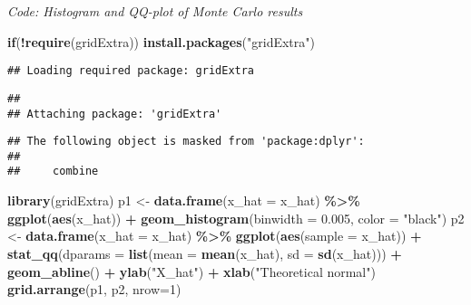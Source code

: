 \documentclass[
]{article}
\newenvironment{Shaded}{\begin{snugshade}}{\end{snugshade}}
\newcommand{\ControlFlowTok}[1]{\textcolor[rgb]{0.13,0.29,0.53}{\textbf{#1}}}
\newcommand{\DataTypeTok}[1]{\textcolor[rgb]{0.13,0.29,0.53}{#1}}
\newcommand{\DecValTok}[1]{\textcolor[rgb]{0.00,0.00,0.81}{#1}}
\newcommand{\FloatTok}[1]{\textcolor[rgb]{0.00,0.00,0.81}{#1}}
\newcommand{\KeywordTok}[1]{\textcolor[rgb]{0.13,0.29,0.53}{\textbf{#1}}}
\newcommand{\NormalTok}[1]{#1}
\newcommand{\OperatorTok}[1]{\textcolor[rgb]{0.81,0.36,0.00}{\textbf{#1}}}
\newcommand{\StringTok}[1]{\textcolor[rgb]{0.31,0.60,0.02}{#1}}
\begin{document}
\emph{Code: Histogram and QQ-plot of Monte Carlo results}

\begin{Shaded}
\begin{Highlighting}[]
\ControlFlowTok{if}\NormalTok{(}\OperatorTok{!}\KeywordTok{require}\NormalTok{(gridExtra)) }\KeywordTok{install.packages}\NormalTok{(}\StringTok{"gridExtra"}\NormalTok{)}
\end{Highlighting}
\end{Shaded}

\begin{verbatim}
## Loading required package: gridExtra
\end{verbatim}

\begin{verbatim}
## 
## Attaching package: 'gridExtra'
\end{verbatim}

\begin{verbatim}
## The following object is masked from 'package:dplyr':
## 
##     combine
\end{verbatim}

\begin{Shaded}
\begin{Highlighting}[]
\KeywordTok{library}\NormalTok{(gridExtra)}
\NormalTok{p1 \textless{}{-}}\StringTok{ }\KeywordTok{data.frame}\NormalTok{(}\DataTypeTok{x\_hat =}\NormalTok{ x\_hat) }\OperatorTok{\%\textgreater{}\%}
\StringTok{    }\KeywordTok{ggplot}\NormalTok{(}\KeywordTok{aes}\NormalTok{(x\_hat)) }\OperatorTok{+}
\StringTok{    }\KeywordTok{geom\_histogram}\NormalTok{(}\DataTypeTok{binwidth =} \FloatTok{0.005}\NormalTok{, }\DataTypeTok{color =} \StringTok{"black"}\NormalTok{)}
\NormalTok{p2 \textless{}{-}}\StringTok{ }\KeywordTok{data.frame}\NormalTok{(}\DataTypeTok{x\_hat =}\NormalTok{ x\_hat) }\OperatorTok{\%\textgreater{}\%}
\StringTok{    }\KeywordTok{ggplot}\NormalTok{(}\KeywordTok{aes}\NormalTok{(}\DataTypeTok{sample =}\NormalTok{ x\_hat)) }\OperatorTok{+}
\StringTok{    }\KeywordTok{stat\_qq}\NormalTok{(}\DataTypeTok{dparams =} \KeywordTok{list}\NormalTok{(}\DataTypeTok{mean =} \KeywordTok{mean}\NormalTok{(x\_hat), }\DataTypeTok{sd =} \KeywordTok{sd}\NormalTok{(x\_hat))) }\OperatorTok{+}
\StringTok{    }\KeywordTok{geom\_abline}\NormalTok{() }\OperatorTok{+}
\StringTok{    }\KeywordTok{ylab}\NormalTok{(}\StringTok{"X\_hat"}\NormalTok{) }\OperatorTok{+}
\StringTok{    }\KeywordTok{xlab}\NormalTok{(}\StringTok{"Theoretical normal"}\NormalTok{)}
\KeywordTok{grid.arrange}\NormalTok{(p1, p2, }\DataTypeTok{nrow=}\DecValTok{1}\NormalTok{)}
\end{Highlighting}
\end{Shaded}
\end{document}

